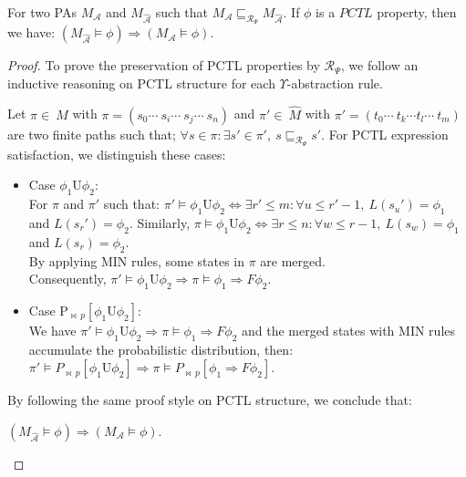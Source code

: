 \begin{proposition}%
For two PAs $M_\mathcal{{A}}$ and $M_\mathcal{{\widehat{A}}}$ such that $M_\mathcal{{A}}\sqsubseteq_{\mathscr{R}_\Psi}M_\mathcal{{\widehat{A}}}$. If $\phi$ is a $PCTL$ property, then we have: $(M_\mathcal{{\widehat{A}}}\models\phi)\Rightarrow(M_\mathcal{{A}}\models\phi)$.
\end{proposition}
\begin{proof}
To prove the preservation of PCTL properties by $\mathscr{R}_\Psi$, we follow an inductive reasoning on PCTL structure for each $\Upsilon$-abstraction rule.


  Let $\pi\in~M$ with $\pi=(s_{0}\cdots~s_{i}\cdots~s_{j}\cdots~s_{n})$ and $\pi'\in~\widehat{M}$ with  $\pi'=(t_{0}\cdots~t_{k}\cdots t_{l}\cdots~t_{m})$ are two finite paths such that; $\forall s\in\pi:\exists s'\in\pi',~ s\sqsubseteq_{\mathscr{R}_\Psi}s'$.
For PCTL expression satisfaction, we distinguish these cases:
\begin{itemize}
  \item Case $\phi_{1}\mathrm{U}\phi_{2}$:\\
For $\pi$ and $\pi'$ such that:
  $\pi'\models \phi_{1}\mathrm{U}\phi_{2}\Leftrightarrow \exists r'\leq m:\forall u\leq r'-1,~ L(s_{u}')=\phi_{1}$ and $L(s_{r}')=\phi_{2}$. Similarly,
  $\pi\models \phi_{1}\mathrm{U}\phi_{2}\Leftrightarrow \exists r\leq n:\forall w\leq r-1,~ L(s_{w})=\phi_{1}$ and $L(s_{r})=\phi_{2}$.\\
By applying MIN rules, some states in $\pi$ are merged. \\Consequently, $\pi'\models \phi_{1}\mathrm{U}\phi_{2}\Rightarrow\pi\models \phi_{1}\Rightarrow F\phi_{2}.$
  \item Case $\mathrm{P}_{\bowtie\,p}[\phi_{1}\mathrm{U}\phi_{2}]$:\\
 We have $\pi'\models \phi_{1}\mathrm{U}\phi_{2}\Rightarrow\pi\models \phi_{1}\Rightarrow F\phi_{2}$ and the merged states with MIN rules accumulate the probabilistic distribution, then: $\pi'\models P_{\bowtie\,p}[\phi_{1}\mathrm{U}\phi_{2}]\Rightarrow\pi\models P_{\bowtie\,p}[\phi_{1}\Rightarrow F\phi_{2}]$.
\end{itemize}
By following the same proof style on PCTL structure, we conclude that:
  \begin{center}
$(M_\mathcal{{\widehat{A}}}\models\phi)\Rightarrow(M_\mathcal{{A}}\models\phi)$.
  \end{center}


\end{proof}
